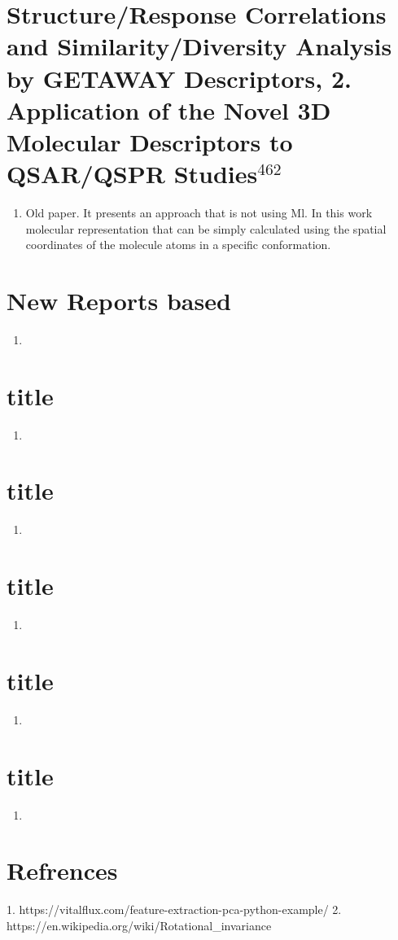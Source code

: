 \documentclass[]{report}
\begin{document}
\section{Structure/Response Correlations and Similarity/Diversity Analysis by GETAWAY Descriptors, 2. Application of the Novel 3D Molecular Descriptors to QSAR/QSPR Studies$ ^{462}$}

\begin{enumerate}
	\item Old paper. It presents an approach that is not using Ml. In this work molecular representation that can be simply calculated using the spatial coordinates of the molecule atoms in a specific conformation.
\end{enumerate}


\section{New Reports based}
\begin{enumerate}
	\item 
\end{enumerate}
\section{title}
\begin{enumerate}
	\item 
\end{enumerate}
\section{title}
\begin{enumerate}
	\item 
\end{enumerate}
\section{title}
\begin{enumerate}
	\item 
\end{enumerate}

\section{title}
\begin{enumerate}
	\item 
\end{enumerate}
\section{title}
\begin{enumerate}
	\item 
\end{enumerate}


\section{Refrences}
1. https://vitalflux.com/feature-extraction-pca-python-example/
2. https://en.wikipedia.org/wiki/Rotational\_invariance 
\end{document}
